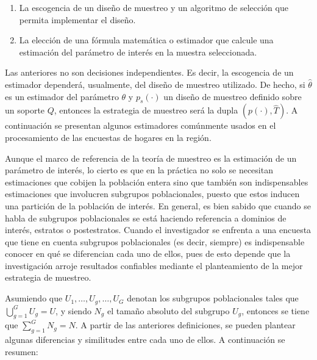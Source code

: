\documentclass[
  12pt,
  spanish,
]{book}
\providecommand{\tightlist}{%
  \setlength{\itemsep}{0pt}\setlength{\parskip}{0pt}}
\begin{document}
\begin{enumerate}
\def\labelenumi{\arabic{enumi}.}
\tightlist
\item
  La escogencia de un diseño de muestreo y un algoritmo de selección que permita implementar el diseño.
\item
  La elección de una fórmula matemática o estimador que calcule una estimación del parámetro de interés en la muestra seleccionada.
\end{enumerate}

Las anteriores no son decisiones independientes. Es decir, la escogencia de un estimador dependerá, usualmente, del diseño de muestreo utilizado. De hecho, si \(\hat\theta\) es un estimador del parámetro \(\theta\) y \(p_s(\cdot)\) un diseño de muestreo definido sobre un soporte \(Q\), entonces la estrategia de muestreo será la dupla \((p(\cdot),\hat{T})\). A continuación se presentan algunos estimadores comúnmente usados en el procesamiento de las encuestas de hogares en la región.

Aunque el marco de referencia de la teoría de muestreo es la estimación de un parámetro de interés, lo cierto es que en la práctica no solo se necesitan estimaciones que cobijen la población entera sino que también son indispensables estimaciones que involucren subgrupos poblacionales, puesto que estos inducen una partición de la población de interés. En general, es bien sabido que cuando se habla de subgrupos poblacionales se está haciendo referencia a dominios de interés, estratos o postestratos. Cuando el investigador se enfrenta a una encuesta que tiene en cuenta subgrupos poblacionales (es decir, siempre) es indispensable conocer en qué se diferencian cada uno de ellos, pues de esto depende que la investigación arroje resultados confiables mediante el planteamiento de la mejor estrategia de muestreo.

Asumiendo que \(U_1, \ldots, U_g, \ldots, U_G\) denotan los subgrupos poblacionales tales que \(\bigcup_{g=1}^GU_g=U\), y siendo \(N_g\) el tamaño absoluto del subgrupo \(U_g\), entonces se tiene que \(\sum_{g=1}^G N_g=N\). A partir de las anteriores definiciones, se pueden plantear algunas diferencias y similitudes entre cada uno de ellos. A continuación se resumen:
\end{document}
